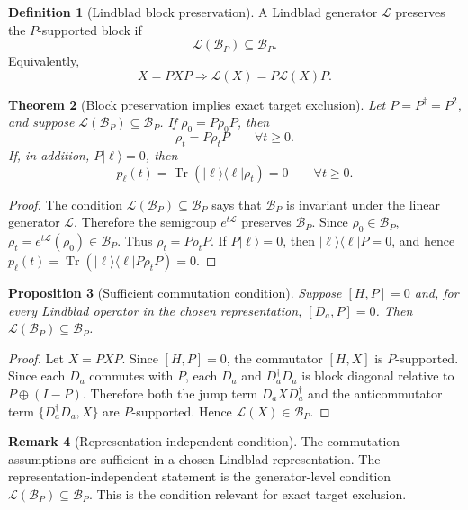 \documentclass[11pt]{article}
\newtheorem{theorem}{Theorem}[section]
\newtheorem{proposition}[theorem]{Proposition}
\theoremstyle{definition}
\newtheorem{definition}[theorem]{Definition}
\newtheorem{remark}[theorem]{Remark}
\newcommand{\Tr}{\operatorname{Tr}}
\begin{document}
\begin{definition}[Lindblad block preservation]
A Lindblad generator $\mathcal L$ preserves the $P$-supported block if
\[
\mathcal L(\mathcal B_P)\subseteq \mathcal B_P.
\]
Equivalently,
\[
X=PXP \Longrightarrow \mathcal L(X)=P\mathcal L(X)P.
\]
\end{definition}

\begin{theorem}[Block preservation implies exact target exclusion]
Let $P=P^\dagger=P^2$, and suppose $\mathcal L(\mathcal B_P)\subseteq\mathcal B_P$. If $\rho_0=P\rho_0P$, then
\[
\rho_t=P\rho_tP\qquad \forall t\ge0.
\]
If, in addition, $P|\ell\rangle=0$, then
\[
p_\ell(t)=\Tr(|\ell\rangle\langle\ell|\rho_t)=0\qquad \forall t\ge0.
\]
\end{theorem}

\begin{proof}
The condition $\mathcal L(\mathcal B_P)\subseteq\mathcal B_P$ says that $\mathcal B_P$ is invariant under the linear generator $\mathcal L$. Therefore the semigroup $e^{t\mathcal L}$ preserves $\mathcal B_P$. Since $\rho_0\in\mathcal B_P$, $\rho_t=e^{t\mathcal L}(\rho_0)\in\mathcal B_P$. Thus $\rho_t=P\rho_tP$. If $P|\ell\rangle=0$, then $|\ell\rangle\langle\ell|P=0$, and hence $p_\ell(t)=\Tr(|\ell\rangle\langle\ell|P\rho_tP)=0$.
\end{proof}

\begin{proposition}[Sufficient commutation condition]
Suppose $[H,P]=0$ and, for every Lindblad operator in the chosen representation, $[D_a,P]=0$. Then $\mathcal L(\mathcal B_P)\subseteq\mathcal B_P$.
\end{proposition}

\begin{proof}
Let $X=PXP$. Since $[H,P]=0$, the commutator $[H,X]$ is $P$-supported. Since each $D_a$ commutes with $P$, each $D_a$ and $D_a^\dagger D_a$ is block diagonal relative to $P\oplus(I-P)$. Therefore both the jump term $D_aXD_a^\dagger$ and the anticommutator term $\{D_a^\dagger D_a,X\}$ are $P$-supported. Hence $\mathcal L(X)\in\mathcal B_P$.
\end{proof}

\begin{remark}[Representation-independent condition]
The commutation assumptions are sufficient in a chosen Lindblad representation. The representation-independent statement is the generator-level condition $\mathcal L(\mathcal B_P)\subseteq\mathcal B_P$. This is the condition relevant for exact target exclusion.
\end{remark}
\end{document}
